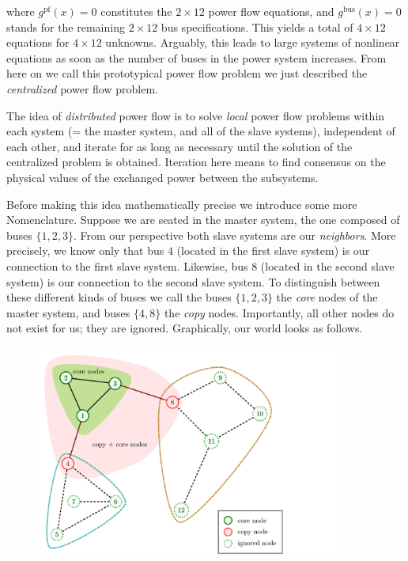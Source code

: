 \documentclass{article}
\newcommand{\state}{x}
\newcommand{\pf}{g^{\text{pf}}}
\newcommand{\busspecs}{g^{\text{bus}}}
\begin{document}
where $\pf( \state ) = 0$ constitutes the $2 \times 12$ power flow equations, and $\busspecs ( \state ) = 0$ stands for the remaining $2 \times 12$ bus specifications.
This yields a total of $4 \times 12$ equations for $4 \times 12$ unknowns.
Arguably, this leads to large systems of nonlinear equations as soon as the number of buses in the power system increases.
From here on we call this prototypical power flow problem we just described the \emph{centralized} power flow problem.

The idea of \emph{distributed} power flow is to solve \emph{local} power flow problems within each system (= the master system, and all of the slave systems), independent of each other, and iterate for as long as necessary until the solution of the centralized problem is obtained.
Iteration here means to find consensus on the physical values of the exchanged power between the subsystems.

Before making this idea mathematically precise we introduce some more Nomenclature.
Suppose we are seated in the master system, the one composed of buses $\{1, 2, 3 \}$.
From our perspective both slave systems are our \emph{neighbors}.
More precisely, we know only that bus $4$ (located in the first slave system) is our connection to the first slave system.
Likewise, bus $8$ (located in the second slave system) is our connection to the second slave system.
To distinguish between these different kinds of buses we call the buses $\{1, 2, 3 \}$ the \emph{core} nodes of the master system, and buses $\{ 4, 8\}$ the \emph{copy} nodes.
Importantly, all other nodes do not exist for us; they are ignored.
Graphically, our world looks as follows.

\begin{figure}
    \includegraphics[width=10cm]{visualization/version_1.png}
\end{figure}
\end{document}
